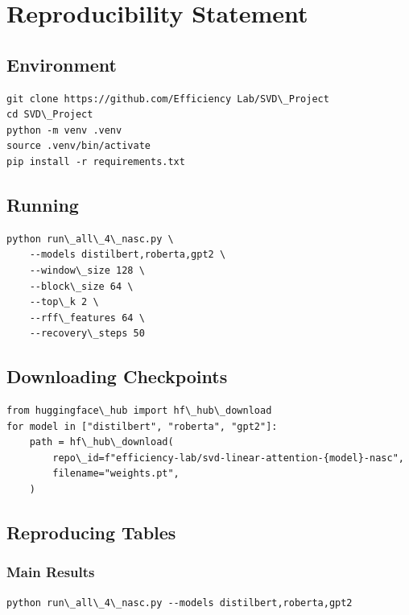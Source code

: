 
\section{Reproducibility Statement}

\subsection{Environment}

\begin{lstlisting}
git clone https://github.com/Efficiency Lab/SVD\_Project
cd SVD\_Project
python -m venv .venv
source .venv/bin/activate
pip install -r requirements.txt
\end{lstlisting}

\subsection{Running}

\begin{lstlisting}
python run\_all\_4\_nasc.py \
    --models distilbert,roberta,gpt2 \
    --window\_size 128 \
    --block\_size 64 \
    --top\_k 2 \
    --rff\_features 64 \
    --recovery\_steps 50
\end{lstlisting}

\subsection{Downloading Checkpoints}

\begin{lstlisting}
from huggingface\_hub import hf\_hub\_download
for model in ["distilbert", "roberta", "gpt2"]:
    path = hf\_hub\_download(
        repo\_id=f"efficiency-lab/svd-linear-attention-{model}-nasc",
        filename="weights.pt",
    )
\end{lstlisting}

\subsection{Reproducing Tables}

\subsubsection{Main Results}

\begin{lstlisting}
python run\_all\_4\_nasc.py --models distilbert,roberta,gpt2
\end{lstlisting}

